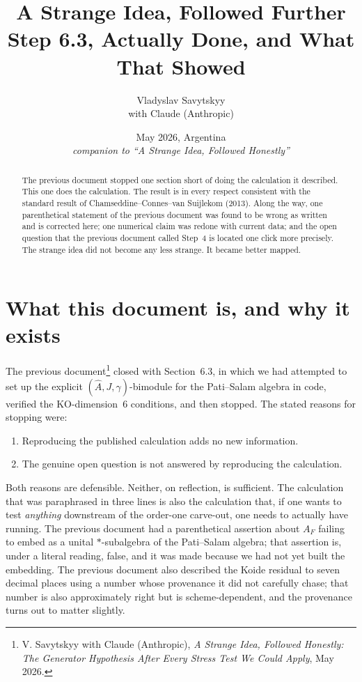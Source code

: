 \documentclass[11pt,a4paper]{article}
\title{A Strange Idea, Followed Further\\
\large Step 6.3, Actually Done, and What That Showed}
\author{Vladyslav Savytskyy\\ \small with Claude (Anthropic)}
\date{May 2026, Argentina \\ \emph{companion to ``A Strange Idea, Followed Honestly''}}
\begin{document}
\maketitle

\begin{abstract}
The previous document stopped one section short of doing the calculation it
described. This one does the calculation. The result is in every respect
consistent with the standard result of Chamseddine--Connes--van Suijlekom (2013).
Along the way, one parenthetical statement of the previous document was found to
be wrong as written and is corrected here; one numerical claim was redone with
current data; and the open question that the previous document called Step~4 is
located one click more precisely. The strange idea did not become any less
strange. It became better mapped.
\end{abstract}

{\setlength{\parskip}{0pt}\tableofcontents}

\bigskip

\section{What this document is, and why it exists}

The previous document\footnote{V. Savytskyy with Claude (Anthropic), \emph{A Strange
Idea, Followed Honestly: The Generator Hypothesis After Every Stress Test We
Could Apply}, May 2026.} closed with Section~6.3, in which we had attempted to
set up the explicit $(\widehat A, J, \gamma)$-bimodule for the Pati--Salam
algebra in code, verified the KO-dimension~6 conditions, and then stopped. The
stated reasons for stopping were:
\begin{enumerate}[label=(\arabic*),leftmargin=2em]
  \item Reproducing the published calculation adds no new information.
  \item The genuine open question is not answered by reproducing the calculation.
\end{enumerate}
Both reasons are defensible. Neither, on reflection, is sufficient. The
calculation that was paraphrased in three lines is also the calculation that, if
one wants to test \emph{anything} downstream of the order-one carve-out, one
needs to actually have running. The previous document had a parenthetical
assertion about $A_F$ failing to embed as a unital $*$-subalgebra of the
Pati--Salam algebra; that assertion is, under a literal reading, false, and it
was made because we had not yet built the embedding. The previous document also
described the Koide residual to seven decimal places using a number whose
provenance it did not carefully chase; that number is also approximately right
but is scheme-dependent, and the provenance turns out to matter slightly.
\end{document}
